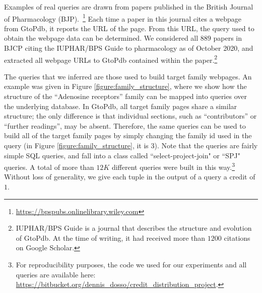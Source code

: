 

Examples of real queries are drawn
from papers published in the British Journal of Pharmacology (BJP).~\footnote{\url{https://bpspubs.onlinelibrary.wiley.com}}  Each time a paper in this journal cites a webpage from GtoPdb, it reports the URL of the page. From this URL, the query used to obtain the webpage data can be determined. 
We considered all $889$ papers in BJCP citing the IUPHAR/BPS Guide to pharmacology \citep{iuphar2018} as of October 2020, and extracted all webpage URLs to GtoPdb contained within the paper.\footnote{\The IUPHAR/BPS Guide is a journal that describes the structure and evolution of GtoPdb. 
At the time of writing, it had received more than $1200$ citations on Google Scholar. 
}


The queries that we inferred are those used to build target family webpages.  An example was given in Figure \ref{figure:family_structure}, where we show how the structure of the ``Adenosine receptors'' family can be mapped into  queries over the underlying database. %
In GtoPdb, all target family pages share a similar structure; the only difference is that individual sections, such as ``contributors'' or ``further readings'', may be absent.
Therefore, the same queries can be used to build all of the target family pages by simply changing the family id used in the query (in Figure \ref{figure:family_structure}, it is 3).
Note that the queries are fairly simple SQL queries, and fall into a class called ``select-project-join" or ``SPJ" queries. 
A total of more than $12K$ different queries were built in this way.\footnote{For reproducibility purposes, the code we used for our experiments and all queries are available here: \url{https://bitbucket.org/dennis_dosso/credit_distribution_project}.}
Without loss of generality, we give each tuple in the output of a query a credit of $1$.

